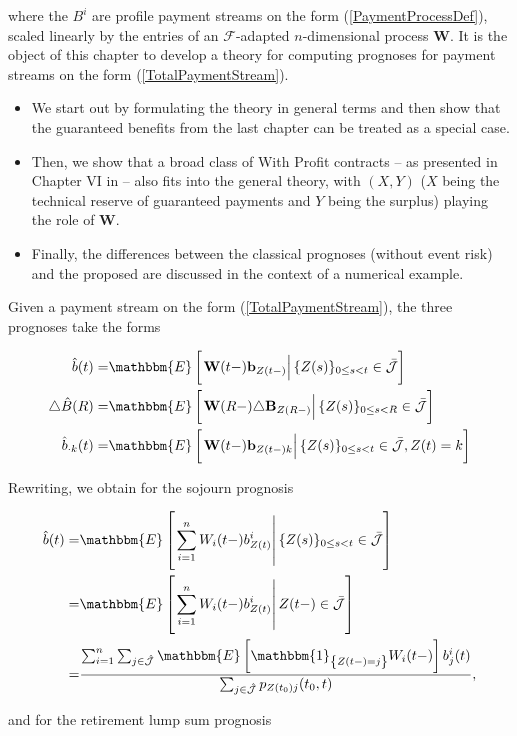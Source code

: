\documentclass{book}
\newcommand{\1}[1]{\mathbbm{1}_{\left\lbrace #1 \right\rbrace}}
\newcommand{\expec}[1][def]{\mathbbm{E} \left[ #1 \right]}
\newcommand{\econd}[2][def]{\mathbbm{E} \left[ \left. #1 \right| #2 \right]}
\theoremstyle{break}
\theoremstyle{remark}
\numberwithin{equation}{section}
\begin{document}
where the $B^i$ are profile payment streams on the form (\ref{PaymentProcessDef}), scaled linearly by the entries of an $\mathcal{F}$-adapted $n$-dimensional process $\textbf{W}$. It is the object of this chapter to develop a theory for computing prognoses for payment streams on the form (\ref{TotalPaymentStream}).

\begin{itemize}
	\item We start out by formulating the theory in general terms and then show that the guaranteed benefits from the last chapter can be treated as a special case. 
	\item Then, we show that a broad class of With Profit contracts -- as presented in Chapter VI in \cite{Liv2Bog} -- also fits into the general theory, with $(X,Y)$ ($X$ being the technical reserve of guaranteed payments and $Y$ being the surplus) playing the role of $\textbf{W}$.
	\item Finally, the differences between the classical prognoses (without event risk) and the proposed are discussed in the context of a numerical example.
\end{itemize}

Given a payment stream on the form (\ref{TotalPaymentStream}), the three prognoses take the forms

\begin{align}
\hat{b}(t) =& \econd[\textbf{W}(t-) \textbf{b}_{Z(t-)}]{\{Z(s) \}_{0 \leq s < t} \in \bar{\mathcal{J}}} \\
\triangle  \hat{B}(R) =& \econd[\textbf{W}(R-) \triangle \textbf{B}_{Z(R-)}]{\{Z(s) \}_{0 \leq s < R} \in \bar{\mathcal{J}}} \\
\hat{b}_{\cdot k}(t) =& \econd[\textbf{W}(t-) \textbf{b}_{Z(t-)k}]{\{Z(s) \}_{0 \leq s < t} \in \bar{\mathcal{J}}, Z(t) = k}
\end{align}

Rewriting, we obtain for the sojourn prognosis

\begin{align*}
	 \hat{b}(t) =& \econd[\sum_{i=1}^n W_i(t-)b_{Z(t)}^i]{\{Z(s) \}_{0 \leq s < t} \in \bar{\mathcal{J}}} \\
	 =& \econd[\sum_{i=1}^n W_i(t-)b_{Z(t)}^i]{Z(t-) \in \bar{\mathcal{J}}} \\
	 =&\frac{\sum_{i=1}^n \sum_{j \in \hat{\mathcal{J}}} \expec[\1{Z(t-)=j} W_i(t-)] b_j^i(t)}{\sum_{j \in \hat{\mathcal{J}}} p_{Z(t_0)j}(t_0,t)},
\end{align*}

and for the retirement lump sum prognosis
\end{document}
